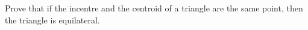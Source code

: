 Prove that if the incentre and the centroid of a triangle are the same point, then the triangle is equilateral.
